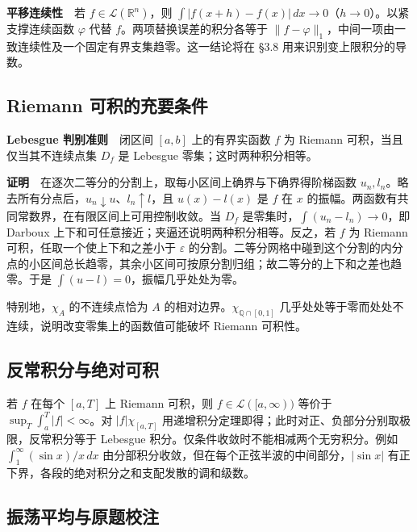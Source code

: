 \documentclass[11pt,a4paper]{article}
\begin{document}
\textbf{平移连续性}　若 \(f\in\mathcal L(\mathbb R^n)\)，则 \(\int|f(x+h)-f(x)|\,dx\to0\)（\(h\to0\)）。以紧支撑连续函数 \(\varphi\) 代替 \(f\)。两项替换误差的积分各等于 \(\|f-\varphi\|_1\)，中间一项由一致连续性及一个固定有界支集趋零。这一结论将在 §3.8 用来识别变上限积分的导数。

\subsection*{Riemann 可积的充要条件}\label{riemann-ux53efux79efux7684ux5145ux8981ux6761ux4ef6}

\textbf{Lebesgue 判别准则}　闭区间 \([a,b]\) 上的有界实函数 \(f\) 为 Riemann 可积，当且仅当其不连续点集 \(D_f\) 是 Lebesgue 零集；这时两种积分相等。

\textbf{证明}　在逐次二等分的分割上，取每小区间上确界与下确界得阶梯函数 \(u_n,l_n\)。略去所有分点后，\(u_n\downarrow u\)、\(l_n\uparrow l\)，且 \(u(x)-l(x)\) 是 \(f\) 在 \(x\) 的振幅。两函数有共同常数界，在有限区间上可用控制收敛。当 \(D_f\) 是零集时，\(\int(u_n-l_n)\to0\)，即 Darboux 上下和可任意接近；夹逼还说明两种积分相等。反之，若 \(f\) 为 Riemann 可积，任取一个使上下和之差小于 \(\varepsilon\) 的分割。二等分网格中碰到这个分割的内分点的小区间总长趋零，其余小区间可按原分割归组；故二等分的上下和之差也趋零。于是 \(\int(u-l)=0\)，振幅几乎处处为零。

特别地，\(\chi_A\) 的不连续点恰为 \(A\) 的相对边界。\(\chi_{\mathbb Q\cap[0,1]}\) 几乎处处等于零而处处不连续，说明改变零集上的函数值可能破坏 Riemann 可积性。

\subsection*{反常积分与绝对可积}\label{ux53cdux5e38ux79efux5206ux4e0eux7eddux5bf9ux53efux79ef}

若 \(f\) 在每个 \([a,T]\) 上 Riemann 可积，则 \(f\in\mathcal L([a,\infty))\) 等价于 \(\sup_T\int_a^T|f|<\infty\)。对 \(|f|\chi_{[a,T]}\) 用递增积分定理即得；此时对正、负部分分别取极限，反常积分等于 Lebesgue 积分。仅条件收敛时不能相减两个无穷积分。例如 \(\int_1^\infty(\sin x)/x\,dx\) 由分部积分收敛，但在每个正弦半波的中间部分，\(|\sin x|\) 有正下界，各段的绝对积分之和支配发散的调和级数。

\subsection*{振荡平均与原题校注}\label{ux632fux8361ux5e73ux5747ux4e0eux539fux9898ux6821ux6ce8}
\end{document}
